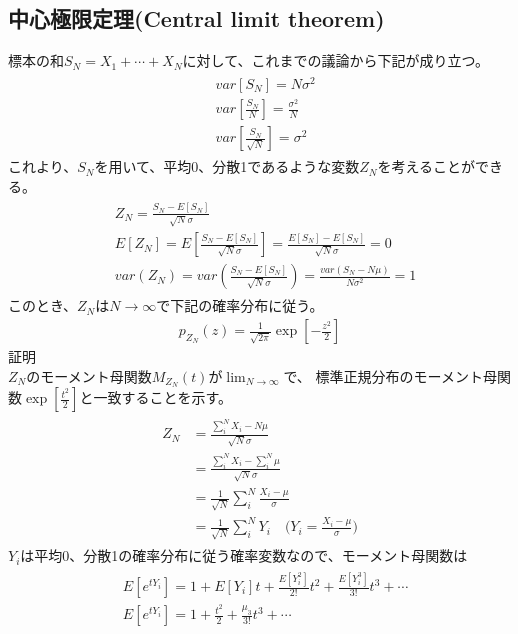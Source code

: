 \documentclass[a4j]{jarticle}
\begin{document}
\subsection{中心極限定理(Central limit theorem)}
標本の和$S_{N}=X_{1} + \cdots + X_{N}$に対して、これまでの議論から下記が成り立つ。
\begin{align}
    \begin{aligned}
    &var[S_{N}]=N\sigma^2 \\
    &var[\frac{S_{N}}{N}]=\frac{\sigma^2}{N} \\
    &var[\frac{S_{N}}{\sqrt{N}}]=\sigma^2
    \end{aligned}  
\end{align}
これより、$S_{N}$を用いて、平均0、分散1であるような変数$Z_{N}$を考えることができる。
\begin{align}
    \begin{aligned}
    &Z_{N}=\frac{S_{N}-E[S_{N}]}{\sqrt{N}\sigma} \\
    &E[Z_{N}]=E[\frac{S_{N}-E[S_{N}]}{\sqrt{N}\sigma}]=\frac{E[S_{N}]-E[S_{N}]}{\sqrt{N}\sigma}=0\\
    &var(Z_{N})=var(\frac{S_{N}-E[S_{N}]}{\sqrt{N}\sigma})=\frac{var(S_{N}-N\mu)}{N\sigma^2}=1
    \end{aligned} 
\end{align}
このとき、$Z_{N}$は$N \to \infty$で下記の確率分布に従う。
\begin{align}
    p_{Z_{N}}(z)=\frac{1}{\sqrt{2\pi}}\exp[-\frac{z^2}{2}]
\end{align}
証明 \\
$Z_{N}$のモーメント母関数${M_{Z_{N}}}(t)$が$\lim_{N \to \infty}$で、
標準正規分布のモーメント母関数$\exp[\frac{t^2}{2}]$と一致することを示す。
\begin{align}
    \begin{aligned}
    Z_{N}&=\frac{\sum_{i}^{N}X_{i}-N\mu}{\sqrt{N}\sigma} \\
    &=\frac{\sum_{i}^{N}X_{i}-\sum_{i}^{N}\mu}{\sqrt{N}\sigma} \\
    &=\frac{1}{\sqrt{N}}\sum_{i}^{N}\frac{X_{i}-\mu}{\sigma} \\
    &=\frac{1}{\sqrt{N}}\sum_{i}^{N}Y_{i} \quad \text{($Y_{i}=\frac{X_{i}-\mu}{\sigma}$)}
    \end{aligned} 
\end{align}
$Y_{i}$は平均0、分散1の確率分布に従う確率変数なので、モーメント母関数は
\begin{align}
    \begin{aligned}
    &E[e^{tY_{i}}]=1+E[Y_{i}]t+\frac{E[Y_{i}^2]}{2!}t^2+\frac{E[Y_{i}^3]}{3!}t^3+\cdots \\ 
    &E[e^{tY_{i}}]=1+\frac{t^2}{2}+\frac{\mu_{3}}{3!}t^3+\cdots \\ 
    \end{aligned} 
\end{align}
\end{document}

